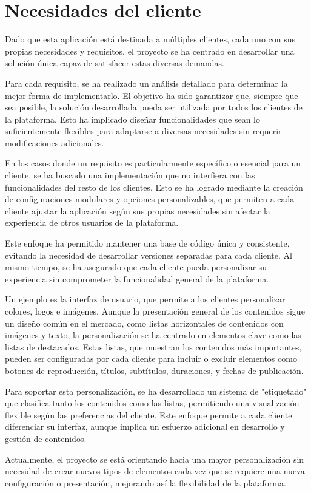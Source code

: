\section{Necesidades del cliente}
\label{sec:analisis_necesidades_cliente}

Dado que esta aplicación está destinada a múltiples clientes, cada uno con sus propias necesidades y requisitos, 
el proyecto se ha centrado en desarrollar una solución única capaz de satisfacer estas diversas demandas.

Para cada requisito, se ha realizado un análisis detallado para determinar la mejor forma de implementarlo. 
El objetivo ha sido garantizar que, siempre que sea posible, la solución desarrollada pueda ser utilizada por 
todos los clientes de la plataforma. Esto ha implicado diseñar funcionalidades que sean lo suficientemente 
flexibles para adaptarse a diversas necesidades sin requerir modificaciones adicionales.

En los casos donde un requisito es particularmente específico o esencial para un cliente, se ha buscado una 
implementación que no interfiera con las funcionalidades del resto de los clientes. Esto se ha logrado mediante 
la creación de configuraciones modulares y opciones personalizables, que permiten a cada cliente ajustar la 
aplicación según sus propias necesidades sin afectar la experiencia de otros usuarios de la plataforma.

Este enfoque ha permitido mantener una base de código única y consistente, evitando la necesidad de desarrollar 
versiones separadas para cada cliente. Al mismo tiempo, se ha asegurado que cada cliente pueda personalizar su 
experiencia sin comprometer la funcionalidad general de la plataforma.

Un ejemplo es la interfaz de usuario, que permite a los clientes personalizar colores, logos e imágenes. Aunque 
la presentación general de los contenidos sigue un diseño común en el mercado, como listas horizontales de contenidos 
con imágenes y texto, la personalización se ha centrado en elementos clave como las listas de destacados. Estas 
listas, que muestran los contenidos más importantes, pueden ser configuradas por cada cliente para incluir o 
excluir elementos como botones de reproducción, títulos, subtítulos, duraciones, y fechas de publicación.

Para soportar esta personalización, se ha desarrollado un sistema de "etiquetado" que clasifica tanto los 
contenidos como las listas, permitiendo una visualización flexible según las preferencias del cliente. Este
 enfoque permite a cada cliente diferenciar su interfaz, aunque implica un esfuerzo adicional en desarrollo y
  gestión de contenidos.

Actualmente, el proyecto se está orientando hacia una mayor personalización sin necesidad de crear nuevos tipos 
de elementos cada vez que se requiere una nueva configuración o presentación, mejorando así la flexibilidad de 
la plataforma.
